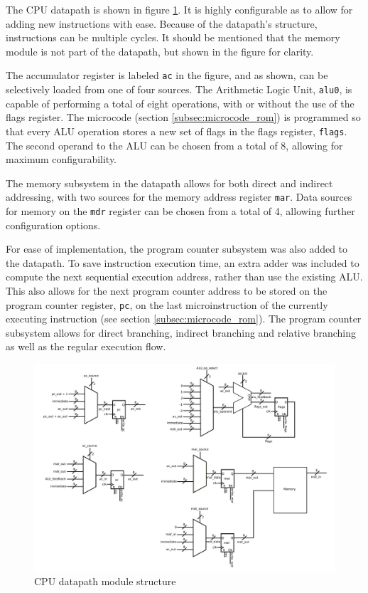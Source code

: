The CPU datapath is shown in figure \ref{fig:datapath}. It is highly
configurable as to allow for adding new instructions with ease. Because of the
datapath's structure, instructions can be multiple cycles. It should be
mentioned that the memory module is not part of the datapath, but shown in the
figure for clarity.\par
The accumulator register is labeled \texttt{ac} in the figure, and as shown,
can be selectively loaded from one of four sources. The Arithmetic Logic Unit,
\texttt{alu0}, is capable of performing a total of eight operations, with or
without the use of the flags register. The microcode (section
\ref{subsec:microcode_rom}) is programmed so that every ALU operation stores a
new set of flags in the flags register, \texttt{flags}. The second operand to
the ALU can be chosen from a total of 8, allowing for maximum
configurability.\par
The memory subsystem in the datapath allows for both direct and indirect
addressing, with two sources for the memory address register \texttt{mar}. Data
sources for memory on the \texttt{mdr} register can be chosen from a total of
4, allowing further configuration options.\par
For ease of implementation, the program counter subsystem was also added to the
datapath. To save instruction execution time, an extra adder was included to
compute the next sequential execution address, rather than use the existing
ALU. This also allows for the next program counter address to be stored on the
program counter register, \texttt{pc}, on the last microinstruction of the
currently executing instruction (see section \ref{subsec:microcode_rom}). The
program counter subsystem allows for direct branching, indirect branching and
relative branching as well as the regular execution flow.
\begin{figure}[h]
	\centering
	\includegraphics[width=\textwidth]{../fig/datapath.pdf}
	\caption{CPU datapath module structure}
	\label{fig:datapath}
\end{figure}
